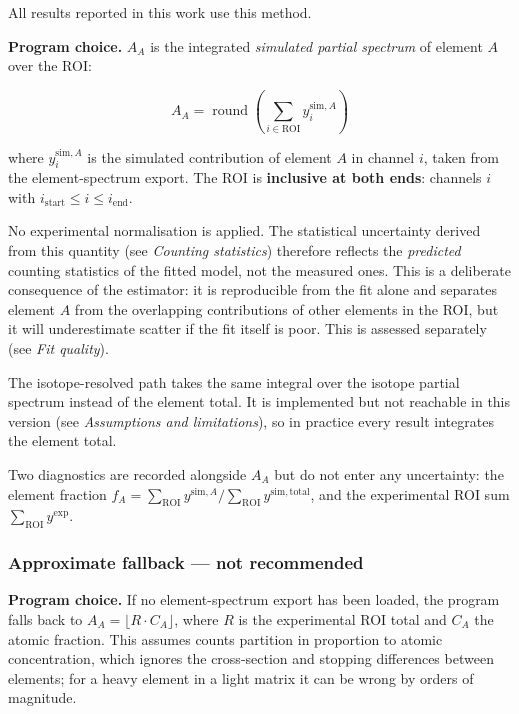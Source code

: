 All results reported in this work use this method.

\textbf{Program choice.} \(A_A\) is the integrated \emph{simulated
partial spectrum} of element \(A\) over the ROI:

\[
A_A = \operatorname{round}\!\left( \sum_{i \in \text{ROI}} y_i^{\mathrm{sim},A} \right)
\]

where \(y_i^{\mathrm{sim},A}\) is the simulated contribution of element
\(A\) in channel \(i\), taken from the element-spectrum export. The ROI
is \textbf{inclusive at both ends}: channels \(i\) with
\(i_\mathrm{start} \le i \le i_\mathrm{end}\).

No experimental normalisation is applied. The statistical uncertainty
derived from this quantity (see \emph{Counting statistics}) therefore
reflects the \emph{predicted} counting statistics of the fitted model,
not the measured ones. This is a deliberate consequence of the
estimator: it is reproducible from the fit alone and separates element
\(A\) from the overlapping contributions of other elements in the ROI,
but it will underestimate scatter if the fit itself is poor. This is
assessed separately (see \emph{Fit quality}).

The isotope-resolved path takes the same integral over the isotope
partial spectrum instead of the element total. It is implemented but not
reachable in this version (see \emph{Assumptions and limitations}), so
in practice every result integrates the element total.

Two diagnostics are recorded alongside \(A_A\) but do not enter any
uncertainty: the element fraction
\(f_A = \sum_{\text{ROI}} y^{\mathrm{sim},A} / \sum_{\text{ROI}} y^{\mathrm{sim,total}}\),
and the experimental ROI sum \(\sum_{\text{ROI}} y^{\mathrm{exp}}\).

\subsubsection{Approximate fallback --- not
recommended}\label{approximate-fallback-not-recommended}

\textbf{Program choice.} If no element-spectrum export has been loaded,
the program falls back to \(A_A = \lfloor R \cdot C_A \rfloor\), where
\(R\) is the experimental ROI total and \(C_A\) the atomic fraction.
This assumes counts partition in proportion to atomic concentration,
which ignores the cross-section and stopping differences between
elements; for a heavy element in a light matrix it can be wrong by
orders of magnitude.

